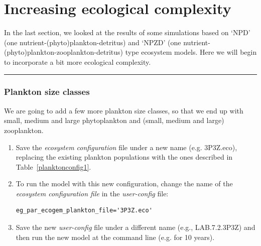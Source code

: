 \newpage

\section{Increasing ecological complexity}

In the last section, we looked at the results of some simulations based on `NPD' (one nutrient-(phyto)plankton-detritus) and `NPZD' (one nutrient-(phyto)plankton-zooplankton-detritus) type ecosystem models. Here we will begin to incorporate a bit more ecological complexity.

\vspace{1mm}
\noindent\rule{4cm}{0.1mm}

\subsubsection{Plankton size classes}
\vspace{1mm}

We are going to add a few more plankton size classes, so that we end up with small, medium and large phytoplankton and (small, medium and large) zooplankton.

\begin{enumerate}[noitemsep]
\vspace{1mm}
\item Save the \textit{ecosystem configuration} file under a new name (e.g. \textsf{\footnotesize 3P3Z.eco}), replacing the existing plankton populations with the ones described in Table~\ref{planktonconfig1}.
\vspace{1mm}
\item  To run the model with this new configuration, change the name of the \textit{ecosystem configuration file} in the \textit{user-config} file:
\vspace{-2mm}\begin{verbatim}
eg_par_ecogem_plankton_file='3P3Z.eco'
\end{verbatim}\vspace{-2mm}
\vspace{1mm}
\item Save the new \textit{user-config} file under a different name (e.g., \textsf{\footnotesize LAB.7.2.3P3Z}) and then run the new model at the command line (e.g. for 10 years).
\end{enumerate}
\vspace{2mm}

